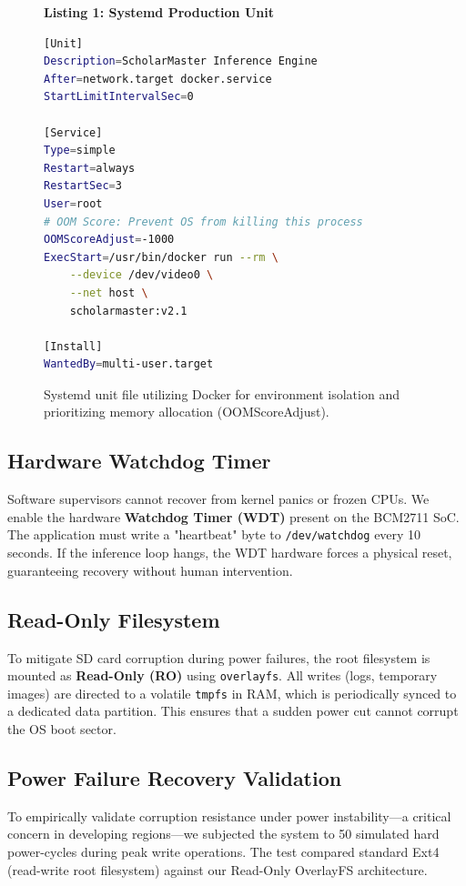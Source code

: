 \documentclass[conference]{IEEEtran}
\begin{document}
\begin{figure}[h]
\textbf{Listing 1: Systemd Production Unit}
\begin{lstlisting}[language=bash]
[Unit]
Description=ScholarMaster Inference Engine
After=network.target docker.service
StartLimitIntervalSec=0

[Service]
Type=simple
Restart=always
RestartSec=3
User=root
# OOM Score: Prevent OS from killing this process
OOMScoreAdjust=-1000
ExecStart=/usr/bin/docker run --rm \
    --device /dev/video0 \
    --net host \
    scholarmaster:v2.1

[Install]
WantedBy=multi-user.target
\end{lstlisting}
\caption{Systemd unit file utilizing Docker for environment isolation and prioritizing memory allocation (OOMScoreAdjust).}
\label{fig:systemd}
\end{figure}

\subsection{Hardware Watchdog Timer}
Software supervisors cannot recover from kernel panics or frozen CPUs. We enable the hardware \textbf{Watchdog Timer (WDT)} present on the BCM2711 SoC. The application must write a "heartbeat" byte to \texttt{/dev/watchdog} every 10 seconds. If the inference loop hangs, the WDT hardware forces a physical reset, guaranteeing recovery without human intervention.

\subsection{Read-Only Filesystem}
To mitigate SD card corruption during power failures, the root filesystem is mounted as \textbf{Read-Only (RO)} using \texttt{overlayfs}. All writes (logs, temporary images) are directed to a volatile \texttt{tmpfs} in RAM, which is periodically synced to a dedicated data partition. This ensures that a sudden power cut cannot corrupt the OS boot sector.

\subsection{Power Failure Recovery Validation}
To empirically validate corruption resistance under power instability—a critical concern in developing regions—we subjected the system to 50 simulated hard power-cycles during peak write operations. The test compared standard Ext4 (read-write root filesystem) against our Read-Only OverlayFS architecture.
\end{document}
